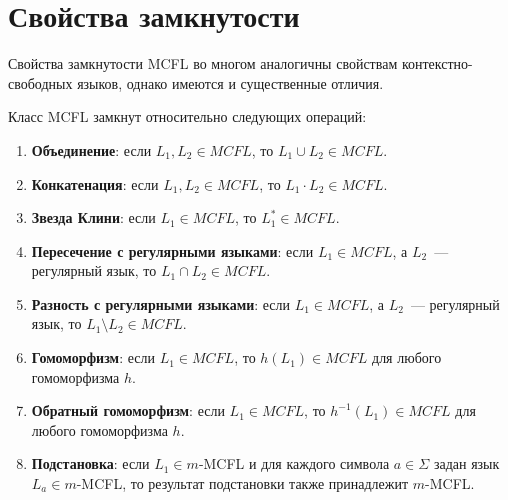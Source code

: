 \section{Свойства замкнутости}
\label{sec:MCFGClosureProperties}



Свойства замкнутости MCFL во многом аналогичны свойствам контекстно-свободных языков, однако имеются и существенные отличия.

\begin{theorem}
    \label{thm:mcf_closure}
    Класс MCFL замкнут относительно следующих операций:
    \begin{enumerate}
        \item \textbf{Объединение}: если $L_1, L_2 \in MCFL$, то $L_1 \cup L_2 \in MCFL$.
        \item \textbf{Конкатенация}: если $L_1, L_2 \in MCFL$, то $L_1 \cdot L_2 \in MCFL$.
        \item \textbf{Звезда Клини}: если $L_1 \in MCFL$, то $L_1^* \in MCFL$.
        \item \textbf{Пересечение с регулярными языками}: если $L_1 \in MCFL$, а $L_2$~--- регулярный язык, то $L_1 \cap L_2 \in MCFL$.
        \item \textbf{Разность с регулярными языками}: если $L_1 \in MCFL$, а $L_2$~--- регулярный язык, то $L_1 \setminus L_2 \in MCFL$.
        \item \textbf{Гомоморфизм}: если $L_1 \in MCFL$, то $h(L_1) \in MCFL$ для любого гомоморфизма $h$.
        \item \textbf{Обратный гомоморфизм}: если $L_1 \in MCFL$, то $h^{-1}(L_1) \in MCFL$ для любого гомоморфизма $h$.
        \item \textbf{Подстановка}: если $L_1 \in m$-MCFL и для каждого символа $a \in \Sigma$ задан язык $L_a \in m$-MCFL, то результат подстановки также принадлежит $m$-MCFL.
    \end{enumerate}
\end{theorem}

